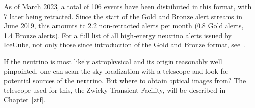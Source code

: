 As of March 2023, a total of 106 events have been distributed in this format, with 7 later being retracted. Since the start of the Gold and Bronze alert streams in June 2019, this amounts to 2.2 non-retracted alerts per month (0.8 Gold alerts, 1.4 Bronze alerts). For a full list of all high-energy neutrino alerts issued by IceCube, not only those since introduction of the Gold and Bronze format, see~\cite{Abbasi2023}.

If the neutrino is most likely astrophysical and its origin reasonably well pinpointed, one can scan the sky localization with a telescope and look for potential sources of the neutrino. But where to obtain optical images from? The telescope used for this, the Zwicky Transient Facility, will be described in Chapter~\ref{ztf}.



